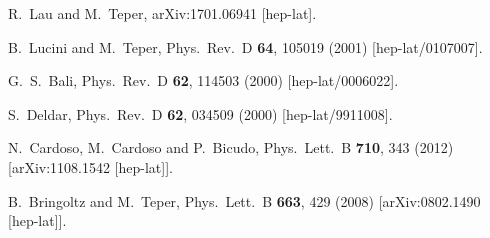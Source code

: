\documentclass[prl,aps,
showpacs,
preprint,
nofootinbib,
floatfix,
superscriptaddress, showkeys
]{revtex4-1}
\begin{document}
\begin{thebibliography}{99}
  R.~Lau and M.~Teper,
  arXiv:1701.06941 [hep-lat].

  
 B.~Lucini and M.~Teper,
 Phys.\ Rev.\ D {\bf 64}, 105019 (2001)
 [hep-lat/0107007].
 
  G.~S.~Bali,
  Phys.\ Rev.\ D {\bf 62}, 114503 (2000)
  [hep-lat/0006022].

  S.~Deldar,
  Phys.\ Rev.\ D {\bf 62}, 034509 (2000)
  [hep-lat/9911008].

  N.~Cardoso, M.~Cardoso and P.~Bicudo,
  Phys.\ Lett.\ B {\bf 710}, 343 (2012)
  [arXiv:1108.1542 [hep-lat]].


 B.~Bringoltz and M.~Teper,
 Phys.\ Lett.\ B {\bf 663}, 429 (2008)
 [arXiv:0802.1490 [hep-lat]].


\end{thebibliography}
\end{document}
